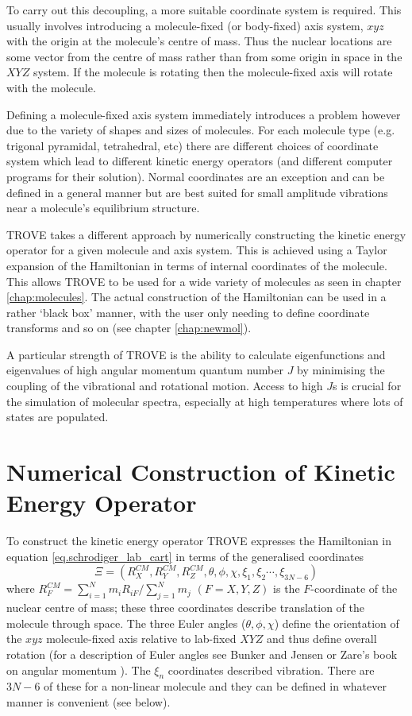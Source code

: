 To carry out this decoupling, a more suitable coordinate system is required. This usually involves introducing a molecule-fixed
(or body-fixed) axis system, $xyz$ with the origin at the molecule's centre of mass. Thus the nuclear locations are some vector
from the centre of mass rather than from some origin in space in the $XYZ$ system. If the molecule is rotating then the molecule-fixed axis will rotate with the molecule. 

Defining a molecule-fixed axis system immediately introduces a problem however due to the variety of shapes and sizes of 
molecules. For each molecule type (e.g. trigonal pyramidal, tetrahedral, etc) there are different choices of coordinate system
which lead to different kinetic energy operators (and different computer programs for their solution). Normal coordinates 
are an exception and can be defined in a general manner but are best suited for small amplitude vibrations near a 
molecule's equilibrium structure. 

TROVE takes a different approach by numerically constructing the kinetic energy operator for a given molecule and axis system.
This is achieved using a Taylor expansion of the Hamiltonian in terms of internal coordinates of the molecule.
This allows TROVE to be used for a wide variety of molecules as seen in chapter \ref{chap:molecules}. The actual construction
of the Hamiltonian can be used in a rather `black box' manner, with the user only needing to define coordinate
transforms and so on (see chapter \ref{chap:newmol}). 

A particular strength of TROVE is the ability to calculate eigenfunctions and eigenvalues of high angular momentum quantum
number $J$ by minimising the coupling of the vibrational and rotational motion. Access to high $J$s is crucial for the 
simulation of molecular spectra, especially at high temperatures where lots of states are populated. 

\section{Numerical Construction of Kinetic Energy Operator}
\label{sec.numerical_T}

To construct the kinetic energy operator TROVE expresses the Hamiltonian in equation \ref{eq.schrodiger_lab_cart} 
in terms of the generalised coordinates
\begin{equation}
\label{eq.gen_coord}
\Xi = \left(R_X^{CM},R_Y^{CM},R_Z^{CM},\theta,\phi,\chi,\xi_1,\xi_2 \cdots ,\xi_{3N-6} \right)
\end{equation}
where $R_F^{CM} = \sum_{i=1}^N m_iR_{iF} / \sum_{j=1}^N m_j$ $(F=X,Y,Z)$ is the $F$-coordinate of the nuclear centre of mass;
these three coordinates describe translation of the molecule through space. The three Euler angles ($\theta,\phi,\chi$) 
define the orientation of the $xyz$ molecule-fixed axis relative to lab-fixed $XYZ$ and thus define overall 
rotation (for a description of Euler angles 
see Bunker and Jensen \cite{98BuJexx} or Zare's book on angular momentum \cite{88Zare.book} ). 
The $\xi_n$ coordinates described vibration. There are $3N - 6$ of these for a non-linear molecule and they can be defined
in whatever manner is convenient (see below).

